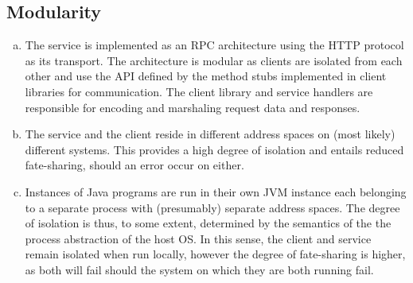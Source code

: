 \documentclass[11pt,a4paper,english]{article}
\begin{document}
\subsection{Modularity}
\begin{enumerate}[(a)]
\item{The service is implemented as an RPC architecture using the HTTP protocol
    as its transport. The architecture is modular as clients are isolated from
    each other and use the API defined by the method stubs implemented in client
    libraries for communication. The client library and service handlers are
    responsible for encoding and marshaling request data and responses.}

\item{The service and the client reside in different address spaces on (most
    likely) different systems. This provides a high degree of isolation and
    entails reduced fate-sharing, should an error occur on either.}

\item{Instances of Java programs are run in their own JVM instance each
    belonging to a separate process with (presumably) separate address
    spaces. The degree of isolation is thus, to some extent, determined by the
    semantics of the the process abstraction of the host OS. In this sense, the
    client and service remain isolated when run locally, however the degree of
    fate-sharing is higher, as both will fail should the system on which they
    are both running fail.}
\end{enumerate}
\end{document}
